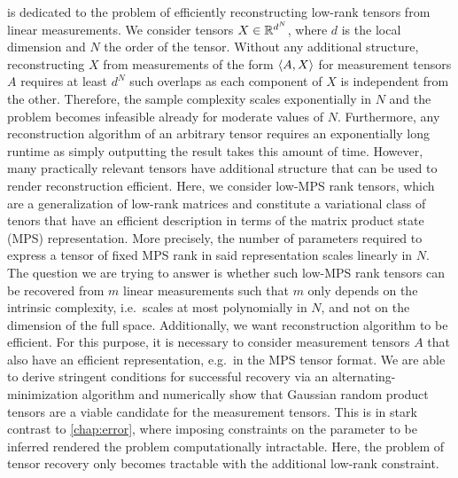  is dedicated to the problem of efficiently reconstructing low-rank tensors from linear measurements.
We consider tensors $X \in {\mathbb{R}}^{d^N}$, where $d$ is the local dimension and $N$ the order of the tensor.
Without any additional structure, reconstructing $X$ from measurements of the form  $\braket{A, X}$ for measurement tensors $A$ requires at least $d^N$ such overlaps as each component of $X$ is independent from the other.
Therefore, the sample complexity scales exponentially in $N$ and the problem becomes infeasible already for moderate values of $N$.
Furthermore, any reconstruction algorithm of an arbitrary tensor requires an exponentially long runtime as simply outputting the result takes this amount of time.
However, many practically relevant tensors have additional structure that can be used to render reconstruction efficient.
Here, we consider low-MPS rank tensors, which are a generalization of low-rank matrices and constitute a variational class of tenors that have an efficient description in terms of the matrix product state (MPS) representation.
More precisely, the number of parameters required to express a tensor of fixed MPS rank in said representation scales linearly in $N$.
The question we are trying to answer is whether such low-MPS rank tensors can be recovered from $m$ linear measurements such that $m$ only depends on the intrinsic complexity, i.e.\ scales at most polynomially in $N$, and not on the dimension of the full space.
Additionally, we want reconstruction algorithm to be efficient.
For this purpose, it is necessary to consider measurement tensors $A$ that also have an efficient representation, e.g.\ in the MPS tensor format.
We are able to derive stringent conditions for successful recovery via an alternating-minimization algorithm and numerically show that Gaussian random product tensors are a viable candidate for the measurement tensors.
This is in stark contrast to \cref{chap:error}, where imposing constraints on the parameter to be inferred rendered the problem computationally intractable.
Here, the problem of tensor recovery only becomes tractable with the additional low-rank constraint.
